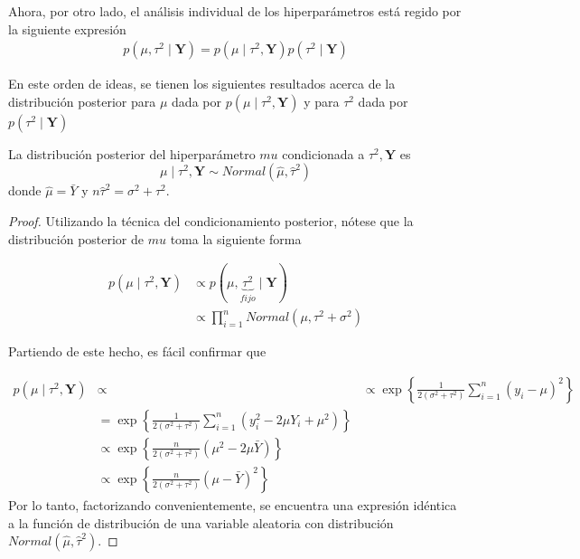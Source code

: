 \documentclass[10pt,openright]{book}\usepackage[]{graphicx}\usepackage[]{color}
\begin{document}
Ahora, por otro lado, el an\'alisis individual de los hiperpar\'ametros est\'a regido por la siguiente expresi\'on
\begin{align*}
p(\mu, \tau^2 \mid \mathbf{Y})=p(\mu \mid  \tau^2,\mathbf{Y})p(\tau^2 \mid \mathbf{Y})
\end{align*}

En este orden de ideas, se tienen los siguientes resultados acerca de la distribuci\'on posterior para $\mu$ dada por $p(\mu \mid  \tau^2,\mathbf{Y})$ y para $\tau^2$ dada por $p(\tau^2 \mid \mathbf{Y})$

\begin{Res}
La distribuci\'on posterior del hiperpar\'ametro $mu$ condicionada a $\tau^2,\mathbf{Y}$ es
\begin{equation*}
\mu \mid \tau^2,\mathbf{Y} \sim Normal \left(\hat{\mu},\hat{\tau}^2\right)
\end{equation*}
donde $\hat{\mu}=\bar{Y}$ y $n\hat{\tau}^2=\sigma^2+\tau^2$.
\end{Res}

\begin{proof}
Utilizando la t\'ecnica del condicionamiento posterior, n\'otese que la distribuci\'on posterior de $mu$ toma la siguiente forma

\begin{align*}
p(\mu \mid \tau^2,\mathbf{Y})&\propto p(\mu,\underbrace{\tau^2}_{fijo} \mid \mathbf{Y}) \\
&\propto \prod_{i=1}^n Normal(\mu,\tau^2+\sigma^2)
\end{align*}

Partiendo de este hecho, es f\'acil confirmar que

\begin{align*}
p(\mu \mid \tau^2,\mathbf{Y})&\propto
&\propto \exp\left\{\frac{1}{2(\sigma^2+\tau^2)}\sum_{i=1}^n(y_i-\mu)^2\right\}\\
&= \exp\left\{\frac{1}{2(\sigma^2+\tau^2)}\sum_{i=1}^n(y_i^2-2\mu Y_i+\mu^2)\right\}\\
&\propto \exp\left\{\frac{n}{2(\sigma^2+\tau^2)}(\mu^2-2\mu\bar{Y})\right\}\\
&\propto \exp\left\{\frac{n}{2(\sigma^2+\tau^2)}(\mu-\bar{Y})^2\right\}
\end{align*}
Por lo tanto, factorizando convenientemente, se encuentra una expresi\'on id\'entica a la
funci\'on de distribuci\'on de una variable aleatoria con distribuci\'on $Normal(\hat{\mu},\hat{\tau}^2)$.
\end{proof}
\end{document}
